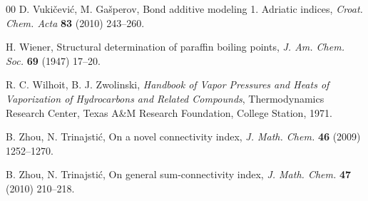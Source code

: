 \documentclass[a5paper, 10pt]{article}
\theoremstyle{plain}
\theoremstyle{remark}
\theoremstyle{definition}
\begin{document}
\begin{thebibliography}{00}
   D. Vuki\v{c}evi\'c, M. Ga\v{s}perov, Bond additive
  modeling 1. Adriatic indices, \textit{Croat. Chem. Acta\/} \textbf{83} (2010)
  243--260.

   H. Wiener, Structural determination of paraffin boiling
  points, \textit{J. Am. Chem. Soc.\/} \textbf{69} (1947) 17--20.

   R. C. Wilhoit, B. J. Zwolinski,
  \textit{Handbook of Vapor Pressures and Heats of Vaporization of
  Hydrocarbons and Related Compounds\/}, Thermodynamics Research Center, Texas A\&M Research Foundation, College Station, 1971.

  B. Zhou, N. Trinajsti\'c, On a novel connectivity index, \textit{J. Math.
  Chem.\/} \textbf{46} (2009) 1252--1270.

   B. Zhou, N. Trinajsti\'c, On general
  sum-connectivity index, \textit{J. Math. Chem.\/} \textbf{47} (2010)
  210--218.

\end{thebibliography}
\end{document}
